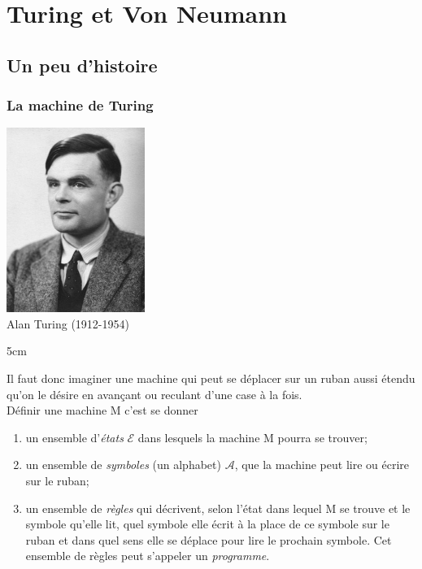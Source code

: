 \documentclass[a4paper,12pt,french]{book}
\begin{document}
\chapter*{Turing et Von Neumann}

\section{Un peu d'histoire}
\subsection{La machine de Turing}
{\begin{center}\includegraphics[width=4.5cm]{turing.jpg}\\\footnotesize Alan Turing (1912-1954)\end{center}}{5cm}


Il faut donc imaginer une machine qui peut se déplacer sur un ruban aussi étendu qu'on le désire en avançant ou reculant d'une case à la fois.\\
Définir une machine M c'est se donner
\begin{enumerate}[-]
	\item 	un ensemble d'\textit{états} $\mathcal{E}$ dans lesquels la machine M pourra se trouver;
	\item 	un ensemble de \textit{symboles} (un alphabet) $\mathcal{A}$, que la machine peut lire ou écrire sur le ruban;
	\item 	un ensemble de \textit{règles} qui décrivent, selon l'état dans lequel M se trouve et le symbole qu'elle lit, quel symbole elle écrit à
	la place de ce symbole sur le ruban et dans quel sens elle se déplace pour lire le prochain symbole. Cet ensemble de règles peut s'appeler un
	\textit{programme}.
\end{enumerate}
\end{document}
